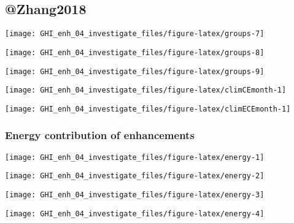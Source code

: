 \documentclass[
  10pt,
  a4paper,oneside]{article}
\begin{document}
\hypertarget{zhang2018}{%
\subsection{@Zhang2018}\label{zhang2018}}

\begin{center}\texttt{[image: GHI\_enh\_04\_investigate\_files/figure-latex/groups-7]} \end{center}

\begin{center}\texttt{[image: GHI\_enh\_04\_investigate\_files/figure-latex/groups-8]} \end{center}

\begin{center}\texttt{[image: GHI\_enh\_04\_investigate\_files/figure-latex/groups-9]} \end{center}

\begin{center}\texttt{[image: GHI\_enh\_04\_investigate\_files/figure-latex/climCEmonth-1]} \end{center}

\begin{center}\texttt{[image: GHI\_enh\_04\_investigate\_files/figure-latex/climECEmonth-1]} \end{center}

\newpage
\FloatBarrier

\hypertarget{energy-contribution-of-enhancements}{%
\subsubsection{Energy contribution of enhancements}\label{energy-contribution-of-enhancements}}

\begin{center}\texttt{[image: GHI\_enh\_04\_investigate\_files/figure-latex/energy-1]} \end{center}

\begin{center}\texttt{[image: GHI\_enh\_04\_investigate\_files/figure-latex/energy-2]} \end{center}

\begin{center}\texttt{[image: GHI\_enh\_04\_investigate\_files/figure-latex/energy-3]} \end{center}

\begin{center}\texttt{[image: GHI\_enh\_04\_investigate\_files/figure-latex/energy-4]} \end{center}
\end{document}

